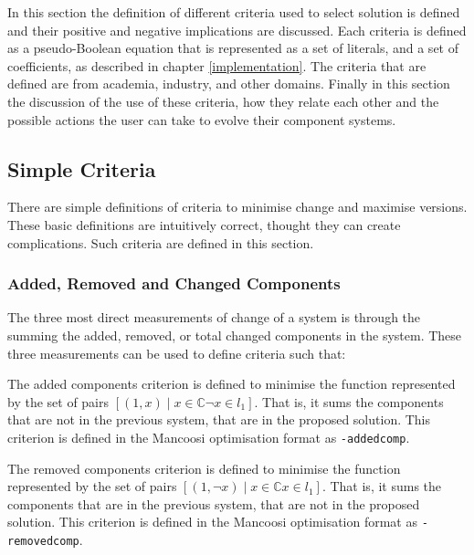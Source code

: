 In this section the definition of different criteria used to select solution is defined and their positive and negative implications are discussed.
Each criteria is defined as a pseudo-Boolean equation that is represented as a set of literals, and a set of coefficients, as described in chapter \ref{implementation}.  
The criteria that are defined are from academia, industry, and other domains.
Finally in this section the discussion of the use of these criteria, how they relate each other and the possible actions the user can take to evolve their component systems.  

\subsection{Simple Criteria}
There are simple definitions of criteria to minimise change and maximise versions.
These basic definitions are intuitively correct, thought they can create complications.
Such criteria are defined in this section.

\subsubsection{Added, Removed and Changed Components}
The three most direct measurements of change of a system is through the summing the added, removed, or total changed components in the system.
These three measurements can be used to define criteria such that:
\begin{defs}
	  The added components criterion is defined to minimise the function
	represented by the set of pairs $[(1,x) \mid x \in \mathbb{C} \neg x \in l_1]$.
	That is, it sums the components that are not in the previous system, that are in the proposed solution.
	This criterion is defined in the Mancoosi optimisation format as \verb+-addedcomp+.

\end{defs}

\begin{defs}
	 The removed components criterion is defined to minimise the function 
	represented by the set of pairs $[(1,\neg x) \mid x \in \mathbb{C} x \in l_1]$.
	That is, it sums the components that are in the previous system, that are not in the proposed solution.
	This criterion is defined in the Mancoosi optimisation format as \verb+-removedcomp+.
\end{defs}

